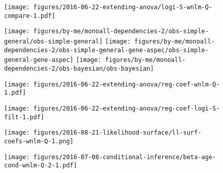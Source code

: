 \documentclass[letterpaper]{article}
\begin{document}
\begin{figure}
\begin{center}
\texttt{[image: figures/2016-06-22-extending-anova/logi-S-wnlm-Q-compare-1.pdf]}
\end{center}
\caption{}
\label{fig:logi.S-wnlm.Q-compare}
\end{figure}

\begin{figure}
\begin{center}
\texttt{[image: figures/by-me/monoall-dependencies-2/obs-simple-general/obs-simple-general]}
\hspace{\fill}
\texttt{[image: figures/by-me/monoall-dependencies-2/obs-simple-general-gene-aspec/obs-simple-general-gene-aspec]}
\hspace{\fill}
\texttt{[image: figures/by-me/monoall-dependencies-2/obs-bayesian/obs-bayesian]}
\end{center}
\caption{}
\label{fig:glm-vs-hierarch}
\end{figure}

\begin{figure}
\begin{center}
\texttt{[image: figures/2016-06-22-extending-anova/reg-coef-wnlm-Q-1.pdf]}
\end{center}
\caption{}
\label{fig:all-effects-wnlm.Q}
\end{figure}

\begin{figure}
\begin{center}
\texttt{[image: figures/2016-06-22-extending-anova/reg-coef-logi-S-filt-1.pdf]}
\end{center}
\caption{}
\label{fig:all-effects-logi.S}
\end{figure}

\begin{figure}
\begin{center}
\texttt{[image: figures/2016-08-21-likelihood-surface/ll-surf-coefs-wnlm-Q-1.png]}
\end{center}
\caption{}
\label{fig:ll-non-orthogonality}
\end{figure}

\begin{figure}
\begin{center}
\texttt{[image: figures/2016-07-08-conditional-inference/beta-age-cond-wnlm-Q-2-1.pdf]}
\end{center}
\caption{}
\label{fig:interaction-wnlm.Q}
\end{figure}
\end{document}
